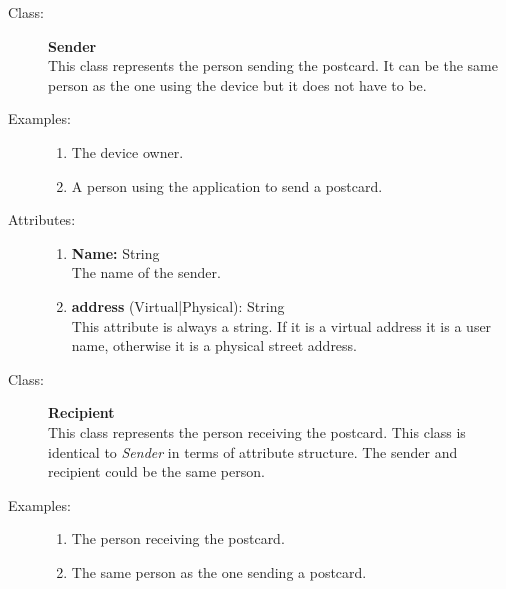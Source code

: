 \documentclass[10pt,a4paper]{article}
\begin{document}
\begin{description}
\item[Class:] \textbf{Sender} \hfill \\
This class represents the person sending the postcard. It can be the same person as the one using the device but it does not have to be.

\item[Examples:] \hfill
\begin{enumerate}
\item The device owner.
\item A person using the application to send a postcard.
\end{enumerate}

\item[Attributes:] \hfill
\begin{enumerate}
\item \textbf{Name:} String \hfill \\The name of the sender. 
\item \textbf{address} (Virtual|Physical): String \hfill \\This attribute is always a string. If it is a virtual address it is a user name, otherwise it is a physical street address. 
\end{enumerate}
\end{description}

\hrulefill

\begin{description}
\item[Class:] \textbf{Recipient} \hfill \\
This class represents the person receiving the postcard. This class is identical to \textit{Sender} in terms of attribute structure. The sender and recipient could be the same person.

\item[Examples:] \hfill
\begin{enumerate}
\item The person receiving the postcard.
\item The same person as the one sending a postcard.
\end{enumerate}
\end{description}

\hrulefill
\end{document}

